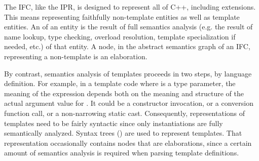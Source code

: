 The IFC, like the IPR, is designed to represent all of C++, including extensions.  This means representing faithfully
non-template entities as well as template entities.  An  of an entity is the result of full semantics
analysis (e.g. the result of name lookup, type checking, overload resolution, template specialization if needed, etc.) of that
entity.  A node, in the abstract semantics graph of an IFC, representing a non-template is an elaboration.

By contrast, semantics analysis of templates proceeds in two steps, by language definition.  For example, in a template code where  is a type parameter, the meaning of the expression  depends both on the meaning and structure of the 
actual argument value for .  It could be a constructor invocation, or a conversion function call, or a non-narrowing
static cast.  Consequently, representations of templates need to be fairly syntactic since only instantiations are fully semantically
analyzed.  Syntax trees () are used to represent templates. 
That representation occasionally contains nodes that are
elaborations, since a certain amount of semantics analysis is required when parsing template definitions.

